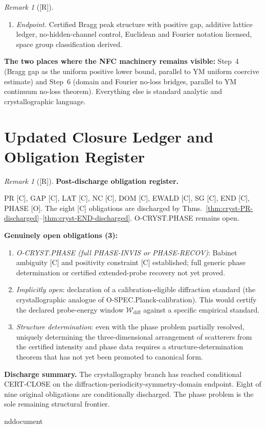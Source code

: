 \documentclass[12pt,oneside]{amsbook}
\theoremstyle{plain}
\theoremstyle{definition}
\theoremstyle{remark}
\newtheorem{remark}[theorem]{Remark}
\newcommand{\status}[1]{\textup{[#1]}}
\begin{document}
\begin{remark}[\status{R}]
\begin{enumerate}[label=\textup{(\arabic*)}]
  \item \emph{Endpoint.}
    Certified Bragg peak structure with positive gap, additive
    lattice ledger, no-hidden-channel control, Euclidean and
    Fourier notation licensed, space group classification
    derived.
\end{enumerate}

\textbf{The two places where the NFC machinery remains
visible:} Step~4 (Bragg gap as the uniform positive lower
bound, parallel to YM uniform coercive estimate) and Step~6
(domain and Fourier no-loss bridges, parallel to YM continuum
no-loss theorem).  Everything else is standard analytic and
crystallographic language.
\end{remark}

\section{Updated Closure Ledger and Obligation Register}
\label{sec:cryst-closure-updated}

\begin{remark}[\status{R}]\label{rem:cryst-closure-updated}
\textbf{Post-discharge obligation register.}

\medskip
PR [C], GAP [C], LAT [C], NC [C], DOM [C], EWALD [C], SG [C], END [C],
PHASE [O].  The eight [C] obligations are discharged by
Thms.~\ref{thm:cryst-PR-discharged}--\ref{thm:cryst-END-discharged}.
O-CRYST.PHASE remains open.

\medskip
\textbf{Genuinely open obligations (3):}
\begin{enumerate}[label=\textup{(\arabic*)}]
  \item \emph{O-CRYST.PHASE (full PHASE-INVIS or PHASE-RECOV)}:
    Babinet ambiguity [C] and positivity constraint [C]
    established; full generic phase determination or certified
    extended-probe recovery not yet proved.
  \item \emph{Implicitly open}: declaration of a calibration-eligible
    diffraction standard (the crystallographic analogue of
    O-SPEC.Planck-calibration).  This would certify the declared
    probe-energy window $\mathcal{W}_{\mathrm{diff}}$ against a
    specific empirical standard.
  \item \emph{Structure determination}: even with the phase
    problem partially resolved, uniquely determining the
    three-dimensional arrangement of scatterers from the
    certified intensity and phase data requires a
    structure-determination theorem that has not yet been
    promoted to canonical form.
\end{enumerate}

\textbf{Discharge summary.} The crystallography branch has
reached conditional CERT-CLOSE on the
diffraction-periodicity-symmetry-domain endpoint.  Eight of
nine original obligations are conditionally discharged.
The phase problem is the sole remaining structural frontier.
\end{remark}



 nd{document}
\end{document}
